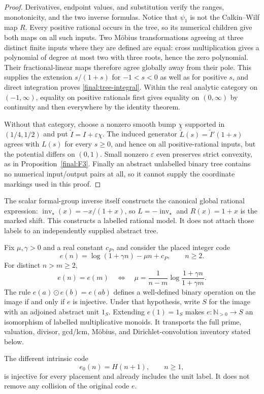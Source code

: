 \begin{proof}
Derivatives, endpoint values, and substitution verify the ranges,
monotonicity, and the two inverse formulas.  Notice that $\psi_1$ is
not the Calkin--Wilf map $R$.  Every positive rational occurs in the
tree, so its numerical children give both maps on all such inputs.
Two M\"obius transformations agreeing at three distinct finite inputs
where they are defined are equal: cross multiplication gives a
polynomial of degree at most two with three roots, hence the zero
polynomial.  Their fractional-linear maps therefore agree globally
away from their pole.  This supplies the extension $s/(1+s)$ for
$-1<s<0$ as well as for positive $s$, and direct integration proves
\eqref{final:tree-integral}.  Within the real analytic category on
$(-1,\infty)$, equality on positive rationals first gives equality
on $(0,\infty)$ by continuity and then everywhere by the identity
theorem.

Without that category, choose a nonzero smooth bump $\chi$ supported
in $(1/4,1/2)$ and put $\widetilde I=I+\varepsilon\chi$.
The induced generator $\widetilde L(s)=\widetilde I'(1+s)$ agrees
with $L(s)$ for every $s\geq0$, and hence on all positive-rational
inputs, but the potential differs on $(0,1)$.  Small nonzero
$\varepsilon$ even preserves strict convexity, as in
Proposition~\ref{final:F3}.  Finally an abstract unlabelled binary
tree contains no numerical input/output pairs at all, so it cannot
supply the coordinate markings used in this proof.
\end{proof}

The scalar formal-group inverse itself constructs the canonical
global rational expression: $\operatorname{inv}_\star(x)=-x/(1+x)$,
so $L=-\operatorname{inv}_\star$ and $R(x)=1+x$ is the marked shift.
This constructs a labelled rational model.  It does not attach those
labels to an independently supplied abstract tree.

\begin{theorem}
\label{final:B3}
Fix $\mu,\gamma>0$ and a real constant $c_P$, and consider the placed
integer code
\[
 e(n)=\log(1+\gamma n)-\mu n+c_P,\qquad n\geq2.
\]
For distinct $n>m\geq2$,
\begin{equation}\label{final:integer-collision}
 e(n)=e(m)\quad\Longleftrightarrow\quad
 \mu=\frac{1}{n-m}\log\frac{1+\gamma n}{1+\gamma m}.
\end{equation}
The rule $e(a)\odot e(b)=e(ab)$ defines a well-defined binary
operation on the image if and only if $e$ is injective.  Under that
hypothesis, write $S$ for the image with an adjoined abstract unit $1_S$.
Extending $e(1)=1_S$ makes $e:\mathbb N_{>0}\to S$ an isomorphism of labelled multiplicative
monoids.  It transports the full prime, valuation, divisor,
gcd/lcm, M\"obius, and Dirichlet-convolution inventory stated below.

The different intrinsic code
\[
 e_0(n)=H(n+1),\qquad n\geq1,
\]
is injective for every placement and already includes the unit label.
It does not remove any collision of the original code $e$.
\end{theorem}

